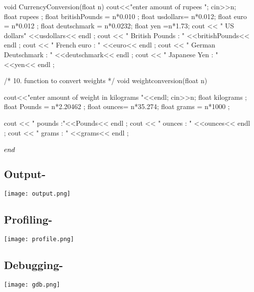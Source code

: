 \documentclass[12pt,a4paper]{article}
\begin{document}
{void CurrencyConversion(float n){
    cout<<"enter amount of rupees  ";
    cin>>n;
    float rupees ;  
float britishPounds = n*0.010 ;  
float usdollars= n*0.012;
float euro = n*0.012  ;  
float deutschmark = n*0.0232;  
float yen =n*1.73;  
cout << " US dollars" <<usdollars<< endl ;  
cout << " British Pounds : " <<britishPounds<< endl ;  
cout << " French euro : " <<euro<< endl ;  
cout << " German Deutschmark : " <<deutschmark<< endl ;  
cout << " Japanese Yen : " <<yen<< endl ;  
}


/*
10. function to convert weights
 */ 
void weightconversion(float n)
{
 cout<<"enter amount of weight in kilograms "<<endl;
    cin>>n;
    float kilograms ;  
float Pounds = n*2.20462 ;  
float ounces= n*35.274;
float grams = n*1000  ;  
 
cout << " pounds :"<<Pounds<< endl ;  
cout << " ounces : " <<ounces<< endl ;  
cout << " grams : " <<grams<< endl ;  


}
\paragraph{$\\end$}

\pagebreak
\subsection{Output-}

\begin{center}
\texttt{[image: output.png]}
\end{center}















\pagebreak

\subsection{Profiling-}


\texttt{[image: profile.png]}

\pagebreak
\subsection{Debugging-}


\texttt{[image: gdb.png]}

}
\end{document}
